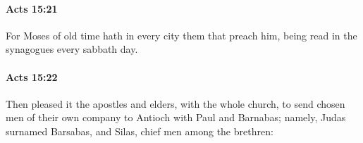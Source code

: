 		\paragraph{Acts 15:21} %
			\label{ACTS-15-21}

			For Moses of old time hath in every city them that preach him, being read in the synagogues every sabbath day.

			\begin{framed}
			\scriptsize
				\begin{compactdesc}
					\item[SBLG] 
				\end{compactdesc}
			\end{framed}

		\paragraph{Acts 15:22} %
			\label{ACTS-15-22}

			Then pleased it the apostles and elders, with the whole church, to send chosen men of their own company to Antioch with Paul and Barnabas; namely, Judas surnamed Barsabas, and Silas, chief men among the brethren:

